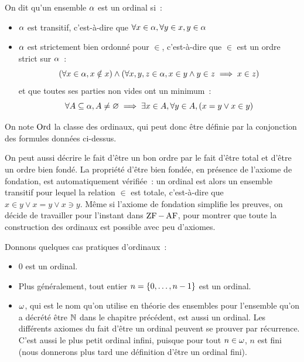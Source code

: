 \begin{definition}
  On dit qu'un ensemble $\alpha$ est un ordinal si~:
  \begin{itemize}
  \item $\alpha$ est transitif, c'est-à-dire que
    $\forall x\in \alpha, \forall y \in x, y\in \alpha$
  \item $\alpha$ est strictement bien ordonné pour $\in$, c'est-à-dire que 
    $\in$ est un ordre strict sur $\alpha$~:
    \[(\forall x\in \alpha, x\notin x)\land (\forall x,y,z\in \alpha,
    x\in y \land y \in z \implies x \in z)\]
    et que toutes ses parties non vides ont un minimum~:
    \[\forall A\subseteq \alpha, A\neq\varnothing\implies
    \exists x \in A, \forall y \in A, (x=y \lor x \in y)\]
  \end{itemize}

  \noindent
  On note $\Ord$ la classe des ordinaux, qui peut donc être définie par la
  conjonction des formules données ci-dessus.
  \index[notation]{$\Ord$}
\end{definition}

\begin{remark}
  On peut aussi décrire le fait d'être un bon ordre par le fait d'être total
  et d'être un ordre bien fondé. La propriété d'être bien fondée, en présence
  de l'axiome de fondation, est automatiquement vérifiée~: un ordinal est alors
  un ensemble transitif pour lequel la relation $\in$ est totale,
  c'est-à-dire que $x\in y \lor x = y \lor x\ni y$. Même si l'axiome de
  fondation simplifie les preuves, on décide de travailler pour l'instant dans
  $\operatorname{ZF} - \operatorname{AF}$, pour montrer que toute la construction des ordinaux est possible
  avec peu d'axiomes.
\end{remark}

\begin{example}
  Donnons quelques cas pratiques d'ordinaux~:
  \begin{itemize}
  \item $0$ est un ordinal.
  \item Plus généralement, tout entier $n = \{0,\ldots,n - 1\}$ est un ordinal.
  \item $\omega$, qui est le nom qu'on utilise en théorie des ensembles pour
    l'ensemble qu'on a décrété être $\mathbb N$ dans le chapitre précédent, est aussi
    un ordinal. Les différents axiomes du fait d'être un ordinal peuvent se
    prouver par récurrence. C'est aussi le plus petit ordinal infini, puisque
    pour tout $n\in \omega$, $n$ est fini (nous donnerons plus tard une définition
    d'être un ordinal fini).
  \end{itemize}
\end{example}

